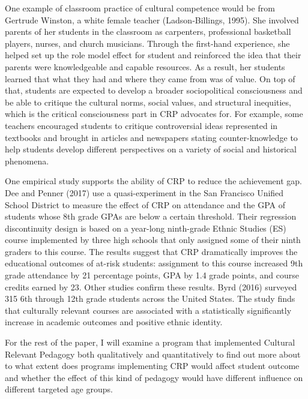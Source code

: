 \noindent One example of classroom practice of cultural competence would be from Gertrude Winston, a white female teacher (Ladson‐Billings, 1995). She involved parents of her students in the classroom as carpenters, professional basketball players, nurses, and church musicians. Through the first-hand experience, she helped set up the role model effect for student and reinforced the idea that their parents were knowledgeable and capable resources. As a result, her students learned that what they had and where they came from was of value. On top of that, students are expected to develop a broader sociopolitical consciousness and be able to critique the cultural norms, social values, and structural inequities, which is the critical consciousness part in CRP advocates for. For example, some teachers encouraged students to critique controversial ideas represented in textbooks and brought in articles and newspapers stating counter-knowledge to help students develop different perspectives on a variety of social and historical phenomena.

\noindent One empirical study supports the ability of CRP to reduce the achievement gap. Dee and Penner (2017) use a quasi-experiment in the San Francisco Unified School District to measure the effect of CRP on attendance and the GPA of students whose 8th grade GPAs are below a certain threshold. Their regression discontinuity design is based on a year-long ninth-grade Ethnic Studies (ES) course implemented by three high schools that only assigned some of their ninth graders to this course. The results suggest that CRP dramatically improves the educational outcomes of at-risk students: assignment to this course increased 9th grade attendance by 21 percentage points, GPA by 1.4 grade points, and course credits earned by 23. Other studies confirm these results. Byrd (2016) surveyed 315 6th through 12th grade students across the United States. The study finds that culturally relevant courses are associated with a statistically significantly increase in academic outcomes and positive ethnic identity.

\noindent For the rest of the paper, I will examine a program that implemented Cultural Relevant Pedagogy both qualitatively and quantitatively to find out more about to what extent does programs implementing CRP would affect student outcome and whether the effect of this kind of pedagogy would have different influence on different targeted age groups.

